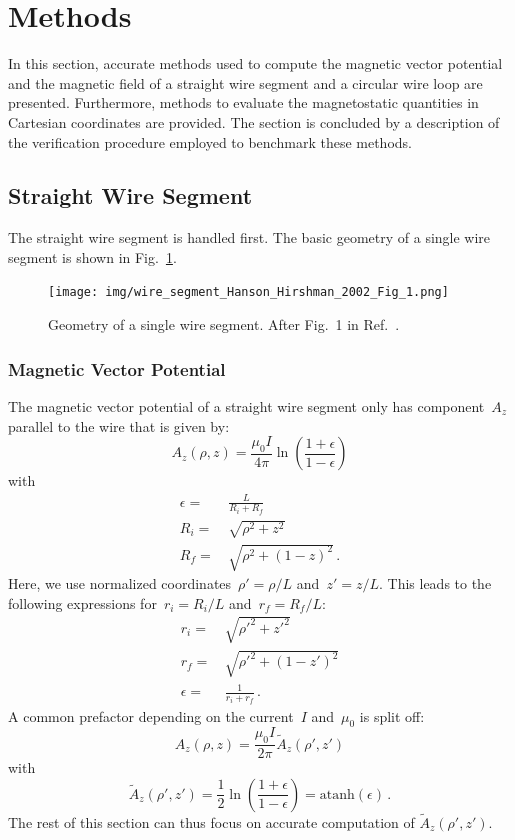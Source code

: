 \section{Methods}
\label{sec:methods}
In this section, accurate methods used to compute the magnetic vector potential and the magnetic field
of a straight wire segment and a circular wire loop are presented.
Furthermore, methods to evaluate the magnetostatic quantities in Cartesian coordinates are provided.
The section is concluded by a description of the verification procedure
employed to benchmark these methods.

\subsection{Straight Wire Segment}
The straight wire segment is handled first.
The basic geometry of a single wire segment is shown in Fig.~\ref{fig:wire_segment_Hanson_Hirshman_2002_Fig_1}.
\begin{figure}[htbp]
 \centering
 \texttt{[image: img/wire\_segment\_Hanson\_Hirshman\_2002\_Fig\_1.png]}
 \caption{Geometry of a single wire segment. After Fig.~1 in Ref.~\cite{hanson_hirshman_2002}.}
 \label{fig:wire_segment_Hanson_Hirshman_2002_Fig_1}
\end{figure}

\subsubsection{Magnetic Vector Potential}
The magnetic vector potential of a straight wire segment
only has component~$A_z$ parallel to the wire that is given by:
\begin{equation}
  A_z(\rho, z) = \frac{\mu_0 I}{4 \pi} \ln \left( \frac{1+\epsilon}{1 - \epsilon} \right)
\end{equation}
with
\begin{align}
  \epsilon =&\, \frac{L}{R_i + R_f} \\
       R_i =&\, \sqrt{\rho^2 + z^2} \\
       R_f =&\, \sqrt{\rho^2 + (1-z)^2} \, .
\end{align}
Here, we use normalized coordinates~$\rho' = \rho/L$ and~$z' = z/L$.
This leads to the following expressions for~$r_i = R_i/L$ and~$r_f = R_f/L$:
\begin{align}
  r_i =&\, \sqrt{{\rho'}^2 +      {z'}^2 } \label{eqn:r_i_default} \\
  r_f =&\, \sqrt{{\rho'}^2 + (1 - {z'})^2} \label{eqn:r_f_default} \\
  \epsilon =&\, \frac{1}{r_i + r_f} \, .
\end{align}
A common prefactor depending on the current~$I$ and~$\mu_0$ is split off:
\begin{equation}
  A_z(\rho, z) = \frac{\mu_0 I}{2 \pi} \tilde{A}_z (\rho', z')
\end{equation}
with
\begin{equation}
  \tilde{A}_z (\rho', z')
  = \frac{1}{2} \ln \left( \frac{1+\epsilon}{1 - \epsilon} \right)
  = \textrm{atanh} (\epsilon) \, .
  \label{eqn:A_z_tilde}
\end{equation}
The rest of this section can thus focus on accurate computation of $\tilde{A}_z (\rho', z')$.

